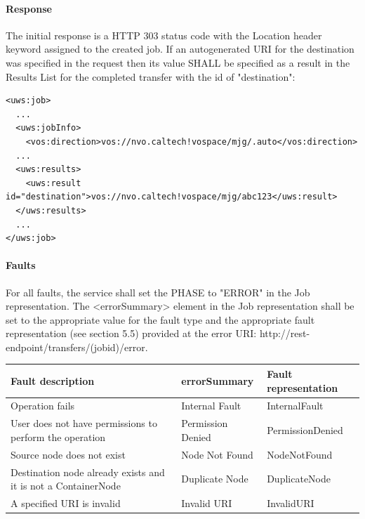\documentclass[11pt,a4paper]{ivoa}
\begin{document}
\paragraph{Response}
The initial response is a HTTP 303 status code with the Location header keyword assigned to the created job.
If an autogenerated URI for the destination was specified in the request then its value SHALL be specified as a result in the Results List for the completed transfer with the id of "destination":

\begin{lstlisting}
<uws:job>
  ...
  <uws:jobInfo>
    <vos:direction>vos://nvo.caltech!vospace/mjg/.auto</vos:direction>
  ...
  <uws:results>
    <uws:result id="destination">vos://nvo.caltech!vospace/mjg/abc123</uws:result>
  </uws:results>
  ...
</uws:job>
\end{lstlisting}

\paragraph{Faults}
For all faults, the service shall set the PHASE to "ERROR" in the Job representation. The <errorSummary> element in the Job representation shall be set to the appropriate value for the fault type and the appropriate fault representation (see section 5.5) provided at the error URI: http://rest-endpoint/transfers/(jobid)/error.

\vspace{3mm}
\begin{tabular}{ p{5cm} l p{4cm} }
\textbf{Fault description} & \textbf{errorSummary} & \textbf{Fault representation} \\
\hline
Operation fails & Internal Fault & InternalFault \\
\hline
User does not have permissions to perform the operation & Permission Denied & PermissionDenied \\
\hline
Source node does not exist & Node Not Found & NodeNotFound \\
\hline
Destination node already exists and it is not a ContainerNode & Duplicate Node & DuplicateNode \\
\hline
A specified URI is invalid & Invalid URI & InvalidURI \\
\hline
\end{tabular}
\vspace{3mm}
\end{document}
